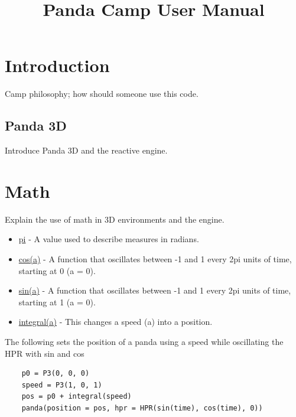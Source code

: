 \documentclass[10pt]{article}
\title{Panda Camp User Manual}
\author{}
\date{}
\begin{document}
\maketitle



\section*{Introduction}
Camp philosophy; how should someone use this code.



\subsection*{Panda 3D}
Introduce Panda 3D and the reactive engine.



\section*{Math}
Explain the use of math in 3D environments and the engine.
\begin{itemize} %
    \item \underline{pi} - A value used to describe measures in radians.
    \item \underline{cos(a)} - A function that oscillates between -1 and 1 every 2pi units of time, starting at 0 (a = 0).
    \item \underline{sin(a)} - A function that oscillates between -1 and 1 every 2pi units of time, starting at 1 (a = 0).
    \item \underline{integral(a)} - This changes a speed (a) into a position.
\end{itemize}
The following sets the position of a panda using a speed while oscillating the HPR with sin and cos
\begin{lstlisting}
    p0 = P3(0, 0, 0)
    speed = P3(1, 0, 1)
    pos = p0 + integral(speed)
    panda(position = pos, hpr = HPR(sin(time), cos(time), 0))
\end{lstlisting}
\end{document}
